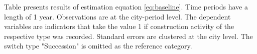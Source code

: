 \begin{table}[htbp]
   \par \raggedright 
   Table presents results of estimation equation \eqref{eq:baseline}. Time periods have a length of 1 year. Observations are at the city-period  level. The dependent variables are indicators that take the value 1 if  construction activity of the respective type was recorded. Standard errors are  clustered at the city level. The switch type "Succession" is omitted as the  reference category.
\end{table}
